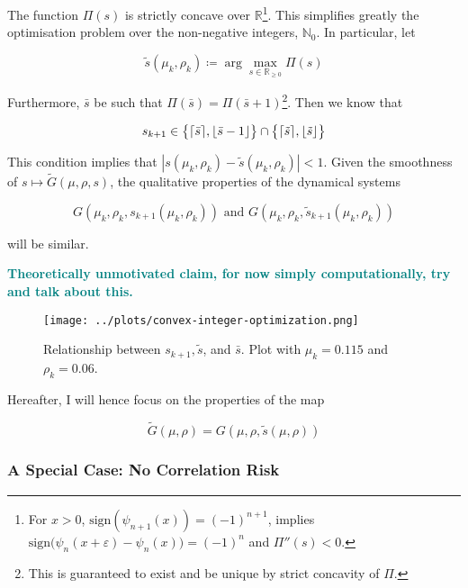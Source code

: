 \documentclass[draft, american, abstract=on]{scrartcl}
\theoremstyle{plain}
\renewcommand{\Re}{\mathbb{R}}
\newcommand{\abs}[1]{\left\lvert#1\right\rvert}
\DeclarePairedDelimiter\ceil{\lceil}{\rceil}
\DeclarePairedDelimiter\floor{\lfloor}{\rfloor}
\newcommand\notes[1]{\textcolor{teal}{\footnotesize \textbf{#1}}}
\begin{document}
The function $\Pi(s)$ is strictly concave over $\Re$\footnote{
  For $x > 0$, $\text{sign}(\psi_{n + 1}(x)) = (-1)^{n + 1}$, implies $\text{sign}\big(\psi_n(x + \varepsilon) - \psi_n(x) \big) = (-1)^n$ and $\Pi''(s) < 0$.
}. This simplifies greatly the optimisation problem over the non-negative integers, $\mathbb{N}_0$. In particular, let

\begin{equation}
  \tilde{s}(\mu_k, \rho_k) \coloneqq \arg\max_{s \in \mathbb{R}_{\geq 0}} \Pi(s)
\end{equation}


Furthermore, $\bar{s}$ be such that $\Pi(\bar{s}) = \Pi(\bar{s} + 1)$\footnote{This is guaranteed to exist and be unique by strict concavity of $\Pi$.}. Then we know that 

\begin{equation}
  s_{k + 1} \in \big\{ \ceil{\bar{s}}, \floor{\bar{s} - 1} \big\} \cap \big\{ \ceil{\tilde{s}}, \floor{\tilde{s}} \big\}
\end{equation}

This condition implies that $\abs{s(\mu_k, \rho_k) - \tilde{s}(\mu_k, \rho_k)} < 1$. Given the smoothness of $s \mapsto \tilde{G}(\mu, \rho, s)$, the qualitative properties of the dynamical systems

\begin{equation*}
    G(\mu_k, \rho_k, s_{k + 1}(\mu_k, \rho_k)) \text{ and } G(\mu_k, \rho_k, \tilde{s}_{k + 1}(\mu_k, \rho_k))
\end{equation*}

will be similar.

\notes{Theoretically unmotivated claim, for now simply computationally, try and talk about this.}

\begin{figure}[H]
  \centering
  \texttt{[image: ../plots/convex-integer-optimization.png]}
  \caption{Relationship between $s_{k + 1}, \tilde{s}$, and $\bar{s}$. Plot with $\mu_k = 0.115$ and $\rho_k = 0.06$.}
  \label{fig:convex-integer-optimization}
\end{figure}

Hereafter, I will hence focus on the properties of the map

\begin{equation}
  \tilde{G}(\mu, \rho) = G(\mu, \rho, \tilde{s}(\mu, \rho))
\end{equation}

\subsubsection{A Special Case: No Correlation Risk}
\end{document}
